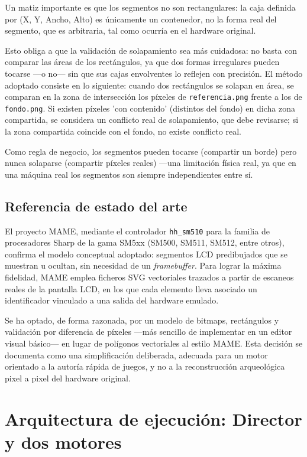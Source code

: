 \documentclass[../main.tex]{subfiles}
\begin{document}
	Un matiz importante es que los segmentos no son rectangulares: la caja definida por (X, Y, Ancho, Alto) es únicamente un contenedor, no la forma real del segmento, que es arbitraria, tal como ocurría en el hardware original.

	Esto obliga a que la validación de solapamiento sea más cuidadosa: no basta con comparar las áreas de los rectángulos, ya que dos formas irregulares pueden tocarse —o no— sin que sus cajas envolventes lo reflejen con precisión. El método adoptado consiste en lo siguiente: cuando dos rectángulos se solapan en área, se comparan en la zona de intersección los píxeles de \texttt{referencia.png} frente a los de \texttt{fondo.png}. Si existen píxeles 'con contenido' (distintos del fondo) en dicha zona compartida, se considera un conflicto real de solapamiento, que debe revisarse; si la zona compartida coincide con el fondo, no existe conflicto real.

	Como regla de negocio, los segmentos pueden tocarse (compartir un borde) pero nunca solaparse (compartir píxeles reales) —una limitación física real, ya que en una máquina real los segmentos son siempre independientes entre sí.

	\subsection{Referencia de estado del arte}
	\label{sec:estado-arte-mame}

	El proyecto MAME, mediante el controlador \texttt{hh\_sm510} para la familia de procesadores Sharp de la gama SM5xx (SM500, SM511, SM512, entre otros), confirma el modelo conceptual adoptado: segmentos LCD predibujados que se muestran u ocultan, sin necesidad de un \textit{framebuffer}. Para lograr la máxima fidelidad, MAME emplea ficheros SVG vectoriales trazados a partir de escaneos reales de la pantalla LCD, en los que cada elemento lleva asociado un identificador vinculado a una salida del hardware emulado.

	Se ha optado, de forma razonada, por un modelo de bitmaps, rectángulos y validación por diferencia de píxeles —más sencillo de implementar en un editor visual básico— en lugar de polígonos vectoriales al estilo MAME. Esta decisión se documenta como una simplificación deliberada, adecuada para un motor orientado a la autoría rápida de juegos, y no a la reconstrucción arqueológica pixel a pixel del hardware original.

	\section{Arquitectura de ejecución: Director y dos motores}
	\label{sec:arquitectura-ejecucion}
\end{document}
